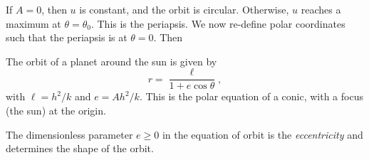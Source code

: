 \documentclass[a4paper]{article}
\begin{document}
If $A = 0$, then $u$ is constant, and the orbit is circular. Otherwise, $u$ reaches a maximum at $\theta = \theta_0$. This is the periapsis. We now re-define polar coordinates such that the periapsis is at $\theta = 0$. Then
\begin{prop}
  The orbit of a planet around the sun is given by
  \[
    r = \frac{\ell}{1 + e\cos \theta},\tag{$*$}
  \]
  with $\ell = h^2/k$ and $e = Ah^2/k$. This is the polar equation of a conic, with a focus (the sun) at the origin.
\end{prop}

\begin{defi}[Eccentricity]
  The dimensionless parameter $e \geq 0$ in the equation of orbit is the \emph{eccentricity} and determines the shape of the orbit.
\end{defi}
\end{document}
